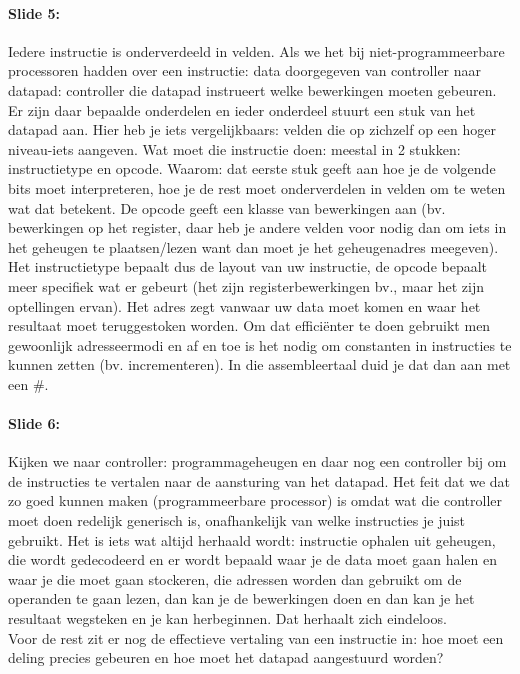 \documentclass[10pt,a4paper]{book}
\begin{document}
\paragraph{Slide 5:} Iedere instructie is onderverdeeld in velden. Als we het bij niet-programmeerbare processoren hadden over een instructie: data doorgegeven van controller naar datapad: controller die datapad instrueert welke bewerkingen moeten gebeuren. Er zijn daar bepaalde onderdelen en ieder onderdeel stuurt een stuk van het datapad aan. Hier heb je iets vergelijkbaars: velden die op zichzelf op een hoger niveau-iets aangeven. Wat moet die instructie doen: meestal in 2 stukken: instructietype en opcode. Waarom: dat eerste stuk geeft aan hoe je de volgende bits moet interpreteren, hoe je de rest moet onderverdelen in velden om te weten wat dat betekent. De opcode geeft een klasse van bewerkingen aan (bv. bewerkingen op het register, daar heb je andere velden voor nodig dan om iets in het geheugen te plaatsen/lezen want dan moet je het geheugenadres meegeven). Het instructietype bepaalt dus de layout van uw instructie, de opcode bepaalt meer specifiek wat er gebeurt (het zijn registerbewerkingen bv., maar het zijn optellingen ervan). Het adres zegt vanwaar uw data moet komen en waar het resultaat moet teruggestoken worden. Om dat effici\"enter te doen gebruikt men gewoonlijk adresseermodi en af en toe is het nodig om constanten in instructies te kunnen zetten (bv. incrementeren). In die assembleertaal duid je dat dan aan met een \#.

\paragraph{Slide 6:} Kijken we naar controller: programmageheugen en daar nog een controller bij om de instructies te vertalen naar de aansturing van het datapad. Het feit dat we dat zo goed kunnen maken (programmeerbare processor) is omdat wat die controller moet doen redelijk generisch is, onafhankelijk van welke instructies je juist gebruikt. Het is iets wat altijd herhaald wordt: instructie ophalen uit geheugen, die wordt gedecodeerd en er wordt bepaald waar je de data moet gaan halen en waar je die moet gaan stockeren, die adressen worden dan gebruikt om de operanden te gaan lezen, dan kan je de bewerkingen doen en dan kan je het resultaat wegsteken en je kan herbeginnen. Dat herhaalt zich eindeloos.\\
Voor de rest zit er nog de effectieve vertaling van een instructie in: hoe moet een deling precies gebeuren en hoe moet het datapad aangestuurd worden?
\end{document}
